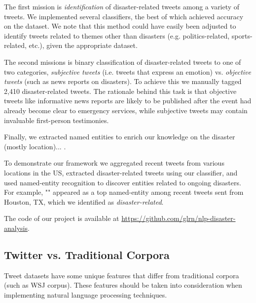 \documentclass[letterpaper,twocolumn,10pt]{article}
\begin{document}
The first mission is \textit{identification} of disaster-related tweets among a variety of tweets. We implemented several classifiers, the best of which achieved \todo{\%} accuracy on the dataset. We note that this method could have easily been adjusted to identify tweets related to themes other than disasters (e.g. politics-related, sports-related, etc.), given the appropriate dataset.

The second missions is binary classification of disaster-related tweets to one of two categories, \textit{subjective tweets} (i.e. tweets that express an emotion) vs. \textit{objective tweets} (such as news reports on disasters). To achieve this we manually tagged 2,410 disaster-related tweets. The rationale behind this task is that objective tweets like informative news reports are likely to be published after the event had already become clear to emergency services, while subjective tweets may contain invaluable first-person testimonies.

Finally, we extracted named entities to enrich our knowledge on the disaster (mostly location)... .

To demonstrate our framework we aggregated recent tweets from various locations in the US, extracted disaster-related tweets using our classifier, and used named-entity recognition to discover entities related to ongoing disasters. For example, "" appeared as a top named-entity among recent tweets sent from Houston, TX, which we identified as \textit{disaster-related}.

The code of our project is available at \url{https://github.com/glrn/nlp-disaster-analysis}.

\subsection{Twitter vs. Traditional Corpora}

Tweet datasets have some unique features that differ from traditional corpora (such as WSJ corpus). These features should be taken into consideration when implementing natural language processing techniques.


\begin{center}
	\parbox{190pt}{}
\end{center}


	
\end{document}
